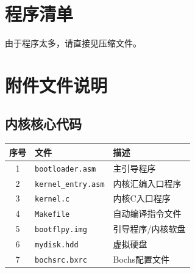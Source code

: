 \documentclass[logo,reportComp]{thesis}
\begin{document}
\appendix
\appendixconfig
\section{程序清单}
\label{sec:code}
由于程序太多，请直接见压缩文件。

\section{附件文件说明}
\subsection{内核核心代码}
\begin{center}
\begin{tabular}{|c|l|l|}\hline
\textbf{序号} & \textbf{文件} & \textbf{描述} \\\hline
1 & \verb'bootloader.asm' & 主引导程序\\\hline
2 & \verb'kernel_entry.asm' & 内核汇编入口程序\\\hline
3 & \verb'kernel.c' & 内核C入口程序\\\hline
4 & \verb'Makefile' & 自动编译指令文件\\\hline
5 & \verb'bootflpy.img' & 引导程序/内核软盘\\\hline
6 & \verb'mydisk.hdd' & 虚拟硬盘\\\hline
7 & \verb'bochsrc.bxrc' & Bochs配置文件\\\hline
\end{tabular}
\end{center}
\end{document}
